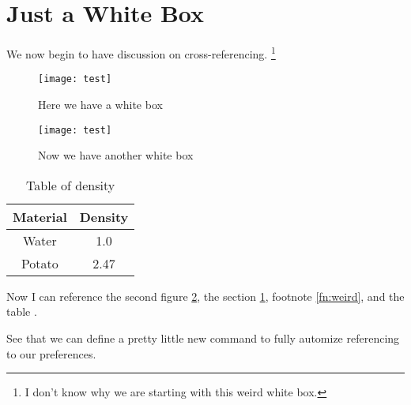 \documentclass{article}
\begin{document}
    \section{Just a White Box} \label{sec:justwhitebox}

    We now begin to have discussion on cross-referencing.
    \footnote{I don't know why we are starting with this weird white box.} \label{fn:weird}

    \begin{figure}[h]
        \centering
        \texttt{[image: test]}
        \caption{Here we have a white box} \label{fig:whitebox1}
    \end{figure}

    \begin{figure}[h]
        \centering
        \texttt{[image: test]}
        \caption{Now we have another white box} \label{fig:whitebox2}
    \end{figure}

    \begin{table}[hbp]
        \centering
        \begin{tabular}{|c|c|}
            \hline
            Material & Density \\
            \hline
            Water & 1.0 \\
            Potato & 2.47 \\
            \hline
        \end{tabular}
        \caption{Table of density} \label{tab:density}
    \end{table}

    Now I can reference the second figure \ref{fig:whitebox2}, the section \ref{sec:justwhitebox},
    footnote \ref{fn:weird}, and the table .

    See that we can define a pretty little new command to fully automize referencing to our preferences.

\end{document}
